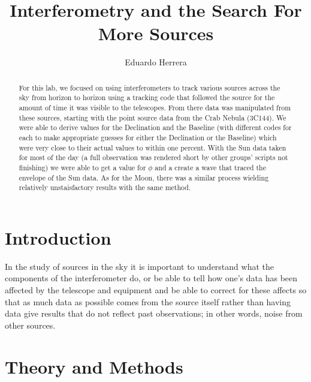 \documentclass[12 pt]{article}
\begin{document}
\title{Interferometry and the Search For More Sources}
\author{Eduardo Herrera}

\maketitle

\begin{abstract}
For this lab, we focused on using interferometers to track
various sources across the sky from horizon to horizon using a tracking
code that followed the source for the amount of time it was visible to
the telescopes. From there data was manipulated from
these sources, starting with the point source data from the Crab Nebula (3C144).
We were able to derive values for the Declination and the Baseline (with
different codes for each to make appropriate guesses for either the
Declination or the Baseline) which
were very close to their actual values to within one percent. With the Sun
data taken for most of the day (a full observation was rendered short
by other groups' scripts not finishing) we were able to get a value
for $\phi$ and a create a wave that traced the envelope of the Sun
data. As for the Moon, there was a similar process wielding relatively
unstaisfactory results with
the same method.  
\end{abstract}


\section*{Introduction}
In the study of sources in the sky it is important to understand what
the components of the interferometer do, or be able to tell how one's
data has been affected by the telescope and equipment and be able to
correct for these affects so that as much data as possible comes from
the source itself rather than having data give results that do not
reflect past observations; in other words, noise from other sources. 
\section*{Theory and Methods}
\end{document}
